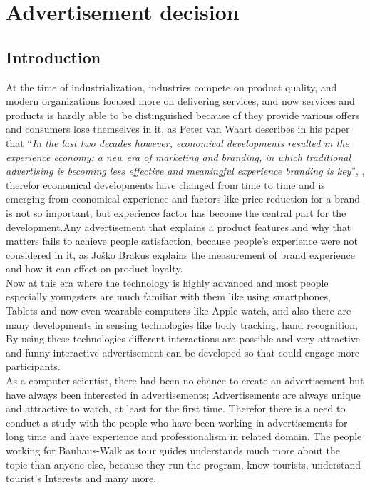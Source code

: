 \chapter{Advertisement decision} %

\label{Chapter4} %
\newpage



\section{Introduction}

At the time of industrialization, industries compete on product quality, and modern organizations focused more on delivering services, and now services and products is hardly able to be distinguished because of they provide various offers and consumers lose themselves in it, as Peter van Waart describes in his paper that ``\emph{In the last two decades however, economical developments resulted in the experience economy: a new era of marketing and branding, in which traditional advertising is becoming less effective and meaningful experience branding is key}'', \cite{Meaningful_ad}, therefor economical developments have changed from time to time and is emerging from economical experience and factors like price-reduction for a brand is not so important, but experience factor has become the central part for the development.Any advertisement that explains a product features and why that matters fails to achieve people satisfaction, because people’s experience were not considered in it, as Joško Brakus \cite{Brand_experience} explains the measurement of brand experience and how it can effect on product loyalty.\\

Now at this era where the technology is highly advanced and most people especially youngsters are much familiar with them like using smartphones, Tablets and now even wearable computers like Apple watch, and also there are many developments in sensing technologies like body tracking, hand recognition, By using these technologies different interactions are possible and very attractive and funny interactive advertisement can be developed so that could engage more participants.\\

As a computer scientist, there had been no chance to create an advertisement but have always been interested in advertisements; Advertisements are always unique and attractive to watch, at least for the first time. Therefor there is a need to conduct a study with the people who have been working in advertisements for long time and have experience and professionalism in related domain. The people working for Bauhaus-Walk as tour guides understands much more about the topic than anyone else, because they run the program, know tourists, understand tourist's Interests and many more.\\

